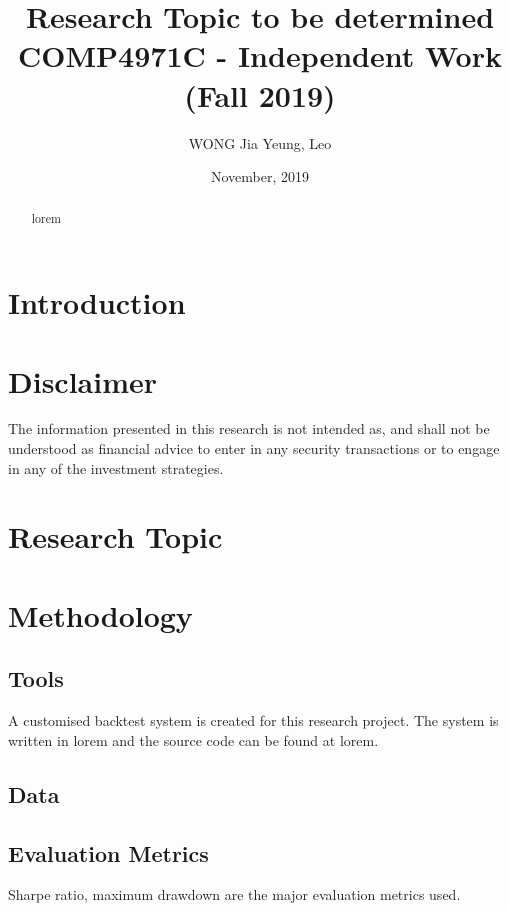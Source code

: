 \documentclass[12pt]{article}
\title{Research Topic to be determined \\[2ex]
  \large COMP4971C - Independent Work (Fall 2019)}
\author{WONG Jia Yeung, Leo}
\date{November, 2019}
\begin{document}
\begin{titlingpage}
  \maketitle
  \begin{abstract}
    lorem
  \end{abstract}
\end{titlingpage}


\tableofcontents

\section{Introduction}

\section{Disclaimer}

The information presented in this research is not intended as, and shall not be understood as financial advice to enter in any security transactions or to engage in any of the investment strategies.

\section{Research Topic}

\section{Methodology}

\subsection{Tools}

A customised backtest system is created for this research project. The system is written in lorem and the source code can be found at lorem.

\subsection{Data}

\subsection{Evaluation Metrics}

Sharpe ratio, maximum drawdown are the major evaluation metrics used.
\end{document}
